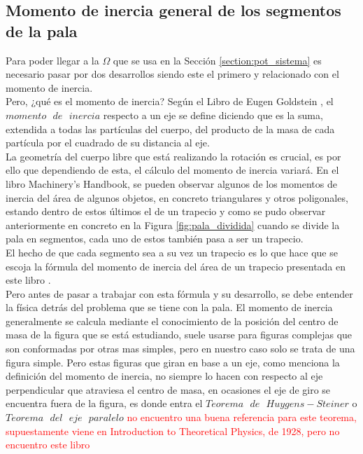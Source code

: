 \subsection{Momento de inercia general de los segmentos de la pala}

Para poder llegar a la $\Omega$ que se usa en la Sección \ref{section:pot_sistema} es necesario pasar por dos desarrollos siendo este el primero y relacionado con el momento de inercia.\\

Pero, ¿qué es el momento de inercia? Según el Libro de Eugen Goldstein \cite[.~269]{goldstein1987mecanica}, el $momento \text{ } de \text{ } inercia$ respecto a un eje se define diciendo que es la suma, extendida a todas las partículas del cuerpo, del producto de la masa de cada partícula por el cuadrado de su distancia al eje.\\


La geometría del cuerpo libre que está realizando la rotación es crucial, es por ello que dependiendo de esta, el cálculo del momento de inercia variará. En el libro Machinery’s
Handbook, se pueden observar algunos de los momentos de inercia del área de algunos objetos, en concreto triangulares y otros poligonales, estando dentro de estos últimos el de un trapecio y como se pudo observar anteriormente en concreto en la Figura \ref{fig:pala_dividida} cuando se divide la pala en segmentos, cada uno de estos también pasa a ser un trapecio.\\

El hecho de que cada segmento sea a su vez un trapecio es lo que hace que se escoja la fórmula del momento de inercia del área de un trapecio presentada en este libro \cite[p.~242]{oberg2012machinery}. \\

Pero antes de pasar a trabajar con esta fórmula y su desarrollo, se debe entender la física detrás del problema que se tiene con la pala. El momento de inercia generalmente se calcula mediante el conocimiento de la posición del centro de masa de la figura que se está estudiando, suele usarse para figuras complejas que son conformadas por otras mas simples, pero en nuestro caso solo se trata de una figura simple. Pero estas figuras que giran en base a un eje, como menciona la definición del momento de inercia, no siempre lo hacen con respecto al eje perpendicular que atraviesa el centro de masa, en ocasiones el eje de giro se encuentra fuera de la figura, es donde entra el $Teorema \text{ } de \text{ } Huygens-Steiner$ o $Teorema \text{ } del \text{ } eje \text{ } paralelo$ \textcolor{red}{no encuentro una buena referencia para este teorema, supuestamente viene en Introduction to Theoretical Physics, de 1928, pero no encuentro este libro} \\


